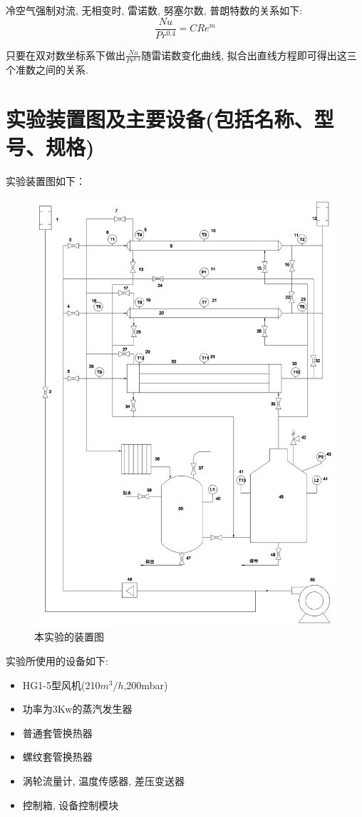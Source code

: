 \documentclass[a4paper,UTF8]{ctexrep}
\theoremstyle{plain}
\theoremstyle{definition}
\numberwithin{equation}{chapter}
\begin{document}
冷空气强制对流, 无相变时, 雷诺数, 努塞尔数, 普朗特数的关系如下:
\begin{equation}
    \frac{Nu}{Pr^{0.4}}=CRe^m
\end{equation}

只要在双对数坐标系下做出$\frac{Nu}{Pr^{0.4}}$随雷诺数变化曲线, 拟合出直线方程即可得出这三个准数之间的关系. 
\newpage

        \section{实验装置图及主要设备(包括名称、型号、规格)}
实验装置图如下：
\begin{figure}[h]
    \centering
    \includegraphics[width=0.7\linewidth]{Drawing1(cad2pdf).pdf}
    \caption{本实验的装置图}
    \label{fig:enter-label}
\end{figure}


    实验所使用的设备如下:
    \begin{itemize}
        \item HG1-5型风机(210$m^3/h$,200mbar)
        \item 功率为3Kw的蒸汽发生器
        \item 普通套管换热器
        \item 螺纹套管换热器
        \item 涡轮流量计, 温度传感器, 差压变送器
        \item 控制箱, 设备控制模块
    \end{itemize}
\end{document}
